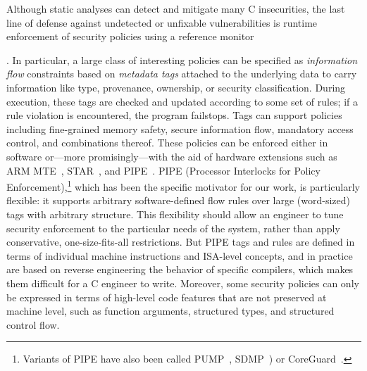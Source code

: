\documentclass{llncs}
\begin{document}
  Although static
analyses can detect and mitigate many C insecurities, the last line of
defense against undetected or unfixable vulnerabilities is runtime
enforcement of security policies using a reference
monitor~{\cite{Anderson72:PlanningStudy}. In particular, a large class
  of interesting policies can be specified as \emph{information flow}
  constraints based on \emph{metadata tags} attached to the underlying
  data to carry information like type, provenance, ownership, or
  security classification.  During execution, these tags are checked
  and updated according to some set of rules; if a rule violation is
  encountered, the program failstops.  Tags can support policies
  including fine-grained memory safety, secure information flow,
  mandatory access control, and combinations thereof.  These policies
  can be enforced either in software or---more promisingly---with the
  aid of hardware extensions such as ARM MTE~\cite{arm-mte},
  STAR~\cite{Gollapudi+23}, and
  PIPE~\cite{Dhawan+15,Azevedo+16,Azevedo+15}.  PIPE (Processor
  Interlocks for Policy Enforcement),\footnote{ Variants of PIPE have
  also been called PUMP~\cite{Dhawan+14,Dhawan+15},
  SDMP~\cite{Dover16,RoesslerD18}) or CoreGuard~\cite{Dover20}.}
  which has been the specific motivator for our work, is particularly
  flexible: it supports arbitrary software-defined flow rules over
  large (word-sized) tags with arbitrary structure. This flexibility
  should allow an engineer to tune security enforcement to the
  particular needs of the system, rather than apply conservative,
  one-size-fits-all restrictions. But PIPE tags and rules are defined
  in terms of individual machine instructions and ISA-level
  concepts, and in practice are based on reverse engineering the behavior
  of specific compilers, which makes them difficult for a C engineer to write.
  Moreover, some security policies can only be expressed in terms of high-level code
  features that are not preserved at machine level, such as function
  arguments, structured types, and structured control flow.

}
\end{document}
